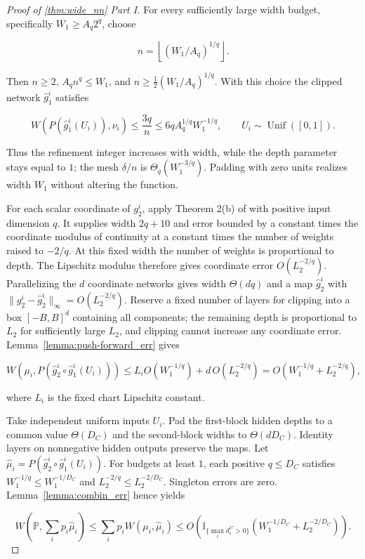 \begin{proof}[Proof of \cref{thm:wide_nn} Part I]
For every sufficiently large width budget, specifically $W_1\geqslant A_q2^q$, choose

\[
n=\left\lfloor(W_1/A_q)^{1/q}\right\rfloor.
\]

Then $n\geqslant2$, $A_qn^q\leqslant W_1$, and $n\geqslant\tfrac12(W_1/A_q)^{1/q}$. With this choice the clipped network $\hat g_1^i$ satisfies

\[
W(P(\hat g_1^i(U_i)),\nu_i)\leqslant\frac{3q}{n}\leqslant6qA_q^{1/q}W_1^{-1/q},\qquad U_i\sim\operatorname{Unif}([0,1]).
\]

Thus the refinement integer increases with width, while the depth parameter stays equal to $1$; the mesh $\delta/n$ is $\Theta_q(W_1^{-3/q})$. Padding with zero units realizes width $W_1$ without altering the function. 

For each scalar coordinate of $g_2^i$, apply Theorem 2(b) of \cite{Yarotsky2018OptimalAO} with positive input dimension $q$. It supplies width $2q+10$ and error bounded by a constant times the coordinate modulus of continuity at a constant times the number of weights raised to $-2/q$. At this fixed width the number of weights is proportional to depth. The Lipschitz modulus therefore gives coordinate error $O(L_2^{-2/q})$. Parallelizing the $d$ coordinate networks gives width $\Theta(dq)$ and a map $\hat g_2^i$ with $\|g_2^i-\hat g_2^i\|_\infty=O(L_2^{-2/q})$. Reserve a fixed number of layers for clipping into a box $[-B,B]^d$ containing all components; the remaining depth is proportional to $L_2$ for sufficiently large $L_2$, and clipping cannot increase any coordinate error. Lemma~\ref{lemma:push-forward_err} gives

\[
W(\mu_i,P(\hat g_2^i\circ\hat g_1^i(U_i)))\leqslant L_iO(W_1^{-1/q})+d\,O(L_2^{-2/q})=O(W_1^{-1/q}+L_2^{-2/q}),
\]

where $L_i$ is the fixed chart Lipschitz constant. 

Take independent uniform inputs $U_i$. Pad the first-block hidden depths to a common value $\Theta(D_C)$ and the second-block widths to $\Theta(dD_C)$. Identity layers on nonnegative hidden outputs preserve the maps. Let $\hat\mu_i=P(\hat g_2^i\circ\hat g_1^i(U_i))$. For budgets at least $1$, each positive $q\leqslant D_C$ satisfies $W_1^{-1/q}\leqslant W_1^{-1/D_C}$ and $L_2^{-2/q}\leqslant L_2^{-2/D_C}$. Singleton errors are zero. Lemma~\ref{lemma:combin_err} hence yields

\[
W\left(\mathbb P,\sum_i p_i\hat\mu_i\right)\leqslant\sum_i p_iW(\mu_i,\hat\mu_i)\leqslant O\left(\mathbb I_{\{\max_i d_i^C>0\}}(W_1^{-1/D_C}+L_2^{-2/D_C})\right).
\]


\end{proof}
